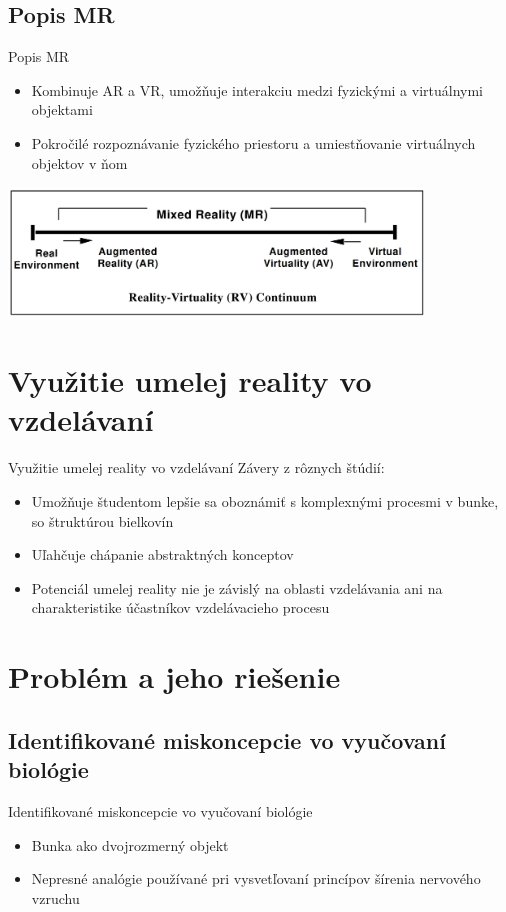 \documentclass[pdf]{beamer}
\begin{document}
\subsection{Popis MR}
\begin{frame}{Popis MR}
    \begin{itemize}
        \item Kombinuje AR a VR, umožňuje interakciu medzi fyzickými a virtuálnymi objektami
        \item Pokročilé rozpoznávanie fyzického priestoru a umiestňovanie virtuálnych objektov v ňom
    \end{itemize}
    \begin{center}
        \includegraphics[width=11cm]{../img/continuum.png}
    \end{center} 
\end{frame}

\section{Využitie umelej reality vo vzdelávaní}
\begin{frame}{Využitie umelej reality vo vzdelávaní}
    Závery z rôznych štúdií:
    \begin{itemize}
        \item Umožňuje študentom lepšie sa oboznámiť s komplexnými procesmi v bunke, so štruktúrou bielkovín
        \item Uľahčuje chápanie abstraktných konceptov
        \item Potenciál umelej reality nie je závislý na oblasti vzdelávania ani na charakteristike účastníkov vzdelávacieho procesu
    \end{itemize}
\end{frame}

\section{Problém a jeho riešenie}
\subsection{Identifikované miskoncepcie vo vyučovaní biológie}
\begin{frame}{Identifikované miskoncepcie vo vyučovaní biológie}
    \begin{itemize}
        \item Bunka ako dvojrozmerný objekt \pause
        \item Nepresné analógie používané pri vysvetľovaní princípov šírenia nervového vzruchu
    \end{itemize}
\end{frame}
\end{document}
